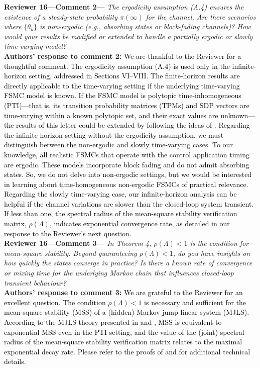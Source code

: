 \begin{bibunit}[alpha]
\textbf{Reviewer 16---Comment 2---}\textit{%
The ergodicity assumption (A.4) ensures the existence of a steady-state probability $\pi(\infty)$ for the channel. 
Are there scenarios where $\{\theta_k\}$ is non-ergodic (e.g., absorbing states or block-fading channels)? 
How would your results be modified or extended to handle a partially ergodic or slowly time-varying model?}\\[2mm]
\textbf{Authors' response to comment 2:} \textcolor{black}{We are thankful to the Reviewer for a thoughtful comment. The ergodicity assumption (A.4) is used only in the infinite-horizon setting, addressed in Sections VI–VIII. The finite-horizon results are directly applicable to the time-varying setting if the underlying time-varying FSMC model is known. If the FSMC model is polytopic time-inhomogeneous (PTI)—that is, its transition probability matrices (TPMs) and SDP vectors are time-varying within a known polytopic set, and their exact values are unknown—the results of this letter could be extended by following the ideas of \cite{zacchialun2025lcss}. Regarding the infinite-horizon setting without the ergodicity assumption, we must distinguish between the non-ergodic and slowly time-varying cases. To our knowledge, all realistic FSMCs that operate with the control application timing are ergodic. These models incorporate block fading and do not admit absorbing states. So, we do not delve into non-ergodic settings, but we would be interested in learning about time-homogeneous non-ergodic FSMCs of practical relevance. Regarding the slowly time-varying case, our infinite-horizon analysis can be helpful if the channel variations are slower than the closed-loop system transient. If less than one, the spectral radius of the mean-square stability verification matrix, $\rho(\mathit{\Lambda})$, indicates exponential convergence rate, as detailed in our response to the Reviewer’s next question.}\\[4mm]
\textbf{Reviewer 16---Comment 3---}\textit{%
In Theorem 4, $\rho(\Lambda) < 1$ is the condition for mean-square stability. 
Beyond guaranteeing $\rho(\Lambda) < 1$, do you have insights on how quickly the states converge in practice? 
Is there a known rate of convergence or mixing time for the underlying Markov chain that
influences closed-loop transient behaviour?}\\[2mm]
\textbf{Authors' response to comment 3:} \textcolor{black}{We are grateful to the Reviewer for an excellent question. The condition $\rho(\Lambda)<1$ is necessary and sufficient for the mean-square stability (MSS) of a (hidden) Markov jump linear system (MJLS). According to the MJLS theory presented in \cite{costa2006discrete} and \cite{zacchialun2019automatica}, MSS is equivalent to exponential MSS even in the PTI setting, and the value of the (joint) spectral radius of the mean-square stability verification matrix relates to the maximal exponential decay rate. Please refer to the proofs of \cite[Prop. 3.25]{costa2006discrete} and \cite[Thm. 14, 16]{zacchialun2019automatica} for additional technical details.}\\[4mm]

\end{bibunit}
